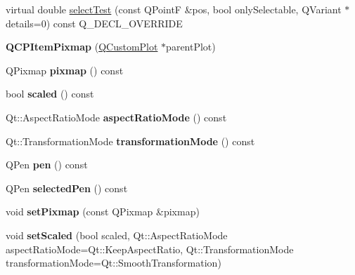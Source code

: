 \begin{DoxyCompactItemize}
\item 
virtual double \hyperlink{class_q_c_p_item_pixmap_a65d1ede7bb479b90d40186d083071947}{select\+Test} (const Q\+PointF \&pos, bool only\+Selectable, Q\+Variant $\ast$details=0) const Q\+\_\+\+D\+E\+C\+L\+\_\+\+O\+V\+E\+R\+R\+I\+DE
\item 
\mbox{\label{class_q_c_p_item_pixmap_aa6de42a37261b21a5480e7da122345c3}} 
{\bfseries Q\+C\+P\+Item\+Pixmap} (\hyperlink{class_q_custom_plot}{Q\+Custom\+Plot} $\ast$parent\+Plot)
\item 
\mbox{\label{class_q_c_p_item_pixmap_a7daef7e0c432902d69e7db3e0e217a1f}} 
Q\+Pixmap {\bfseries pixmap} () const
\item 
\mbox{\label{class_q_c_p_item_pixmap_a8768534b5f3080abfc007db198373327}} 
bool {\bfseries scaled} () const
\item 
\mbox{\label{class_q_c_p_item_pixmap_a662cbca12e6cdcd2a94b0b08879292fd}} 
Qt\+::\+Aspect\+Ratio\+Mode {\bfseries aspect\+Ratio\+Mode} () const
\item 
\mbox{\label{class_q_c_p_item_pixmap_ab963aa9693d49c323948f2820a5785b6}} 
Qt\+::\+Transformation\+Mode {\bfseries transformation\+Mode} () const
\item 
\mbox{\label{class_q_c_p_item_pixmap_a6ae9922eba6386a5ac4e2a569ec29e1f}} 
Q\+Pen {\bfseries pen} () const
\item 
\mbox{\label{class_q_c_p_item_pixmap_a23806a20efcb172f0309e18809dc49d8}} 
Q\+Pen {\bfseries selected\+Pen} () const
\item 
\mbox{\label{class_q_c_p_item_pixmap_a726b69ea4025edf48f9b29b6450548a7}} 
void {\bfseries set\+Pixmap} (const Q\+Pixmap \&pixmap)
\item 
\mbox{\label{class_q_c_p_item_pixmap_ab4d44529a1c6c8d37d0ea7560e042777}} 
void {\bfseries set\+Scaled} (bool scaled, Qt\+::\+Aspect\+Ratio\+Mode aspect\+Ratio\+Mode=Qt\+::\+Keep\+Aspect\+Ratio, Qt\+::\+Transformation\+Mode transformation\+Mode=Qt\+::\+Smooth\+Transformation)

\end{DoxyCompactItemize}
